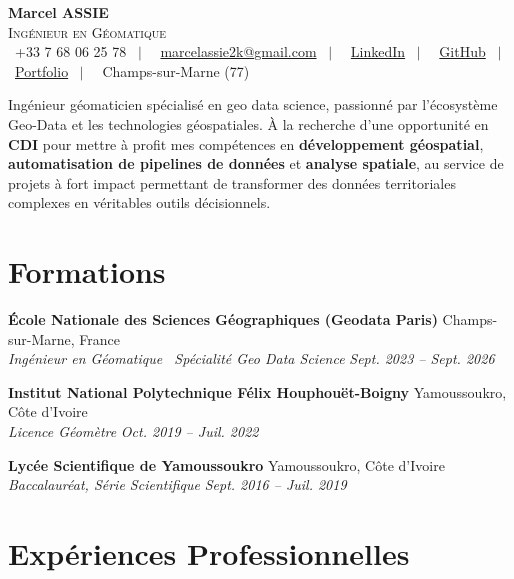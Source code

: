 \documentclass[11pt, a4paper]{article}
\newcommand{\cventry}[4]{
    \vspace{0.1cm}
    \noindent \textbf{#1} \hfill #2 \\
    \noindent \textit{#3} \hfill \textit{#4} \par
    \vspace{0.05cm}
}
\begin{document}
\pagestyle{empty} %



\begin{center}
    {\Huge \textbf{Marcel ASSIE}} \\[0.2cm]
    {\Large \textsc{Ingénieur en Géomatique}} \\[0.3cm]
    \footnotesize
    \faMobile~+33 7 68 06 25 78
    ~$|$~
    \faEnvelope~\href{mailto:marcelassie2k@gmail.com}{marcelassie2k@gmail.com}
    ~$|$~
    \faLinkedinSquare~\href{https://www.linkedin.com/in/marcel-assie/}{LinkedIn}
    ~$|$~
    \faGithub~\href{https://github.com/MarcelAssie/}{GitHub}
    ~$|$~
    \faGlobe~\href{https://marcel-assie-portefolio.dev}{Portfolio}
    ~$|$~
    \faMapMarker~Champs-sur-Marne (77)
\end{center}

\vspace{0.3cm}
\noindent Ingénieur géomaticien spécialisé en geo data science, passionné par l'écosystème Geo-Data et les technologies géospatiales. À la recherche d'une opportunité en \textbf{CDI} pour mettre à profit mes compétences en \textbf{développement géospatial}, \textbf{automatisation de pipelines de données} et \textbf{analyse spatiale}, au service de projets à fort impact permettant de transformer des données territoriales complexes en véritables outils décisionnels.%
\section*{Formations}

\cventry{École Nationale des Sciences Géographiques (Geodata Paris)}{Champs-sur-Marne, France}{Ingénieur en Géomatique \textbullet\ Spécialité Geo Data Science  }{Sept. 2023 -- Sept. 2026}
\cventry{Institut National Polytechnique Félix Houphouët-Boigny}{Yamoussoukro, Côte d'Ivoire}{Licence Géomètre}{Oct. 2019 -- Juil. 2022}
\cventry{Lycée Scientifique de Yamoussoukro}{Yamoussoukro, Côte d'Ivoire}{Baccalauréat, Série Scientifique}{Sept. 2016 -- Juil. 2019}

\section*{Expériences Professionnelles}
\end{document}
